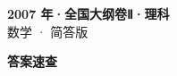 \documentclass[zihao=-4, a4paper]{ctexart}
\begin{document}
\begin{center}
  {\Large\bfseries 2007 年·全国大纲卷Ⅱ·理科}\\[4pt]
  {\large 数学 · 简答版}
\end{center}
\medskip
{}

\clearpage
{}
\begin{center}{\Large\bfseries 答案速查}\end{center}
\medskip

\end{document}
